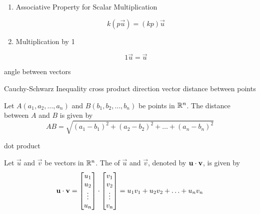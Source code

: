 \documentclass{ximera}
\begin{document}
\begin{enumerate}
  \item 
  Associative Property for Scalar Multiplication
  \begin{expandable}
  $$k(p\vec{u})=(kp)\vec{u}$$
  \end{expandable}

  \item 
  Multiplication by 1
  \begin{expandable}
  $$1\vec{u}=\vec{u}$$
  \end{expandable}
  \end{enumerate}

angle between vectors

Cauchy-Schwarz Inequality
cross product
direction vector
distance between points 
\begin{expandable}
Let $A(a_1, a_2,\ldots ,a_n)$ and $B(b_1, b_2,\ldots ,b_n)$ be points in $\mathbb{R}^n$.  The distance between $A$ and $B$ is given by
$$AB=\sqrt{(a_1-b_1)^2+(a_2-b_2)^2+\ldots +(a_n-b_n)^2}$$
\end{expandable}
dot product
\begin{expandable}
  Let $\vec{u}$ and $\vec{v}$ be vectors in $\mathbb{R}^n$.  The  of $\vec{u}$ and $\vec{v}$, denoted by
  $\mathbf{u}\cdot \mathbf{v}$, is given by
$$\mathbf{u}\cdot\mathbf{v}=\begin{bmatrix}u_1\\u_2\\\vdots\\u_n\end{bmatrix}\cdot\begin{bmatrix}v_1\\v_2\\\vdots\\v_n\end{bmatrix}=u_1v_1+u_2v_2+\ldots+u_nv_n$$
\end{expandable}
\end{document}
